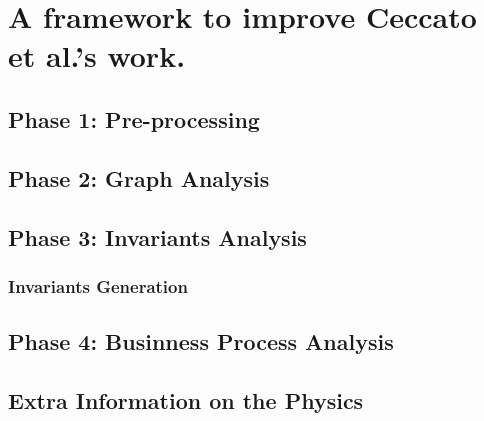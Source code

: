 \chapter{A framework to improve Ceccato et al.’s work.}
\label{proposal}

\section{Phase 1: Pre-processing}
\label{sec:improve_preprocessing}

\section{Phase 2: Graph Analysis}
\label{sec:improve_graphs}

\section{Phase 3: Invariants Analysis}
\label{sec:improve_invariants}

\subsection{Invariants Generation}

\section{Phase 4: Businness Process Analysis}
\label{sec:improve_bpa}

\section{Extra Information on the Physics}
\label{sec:extra_info}
